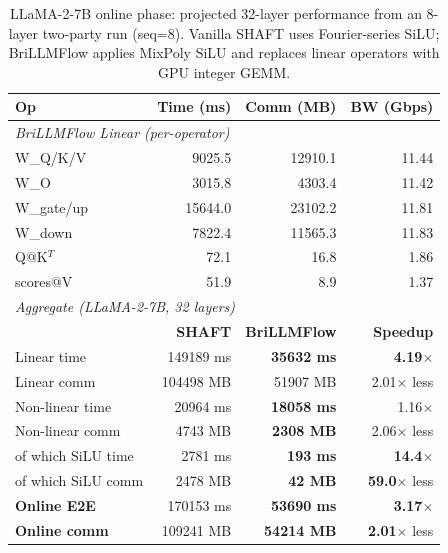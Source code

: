 \begin{table}[t]
\centering
\caption{LLaMA-2-7B online phase: projected 32-layer performance from an 8-layer two-party run (seq=8). Vanilla SHAFT uses Fourier-series SiLU; BriLLMFlow applies MixPoly SiLU and replaces linear operators with GPU integer GEMM.}
\label{tab:llama2_hybrid_comparison}
\setlength{\tabcolsep}{4pt}
\footnotesize
\begin{tabular}{lrrr}
\toprule
\textbf{Op} & \textbf{Time (ms)} & \textbf{Comm (MB)} & \textbf{BW (Gbps)} \\
\midrule
\multicolumn{4}{l}{\textit{BriLLMFlow Linear (per-operator)}} \\
W\_Q/K/V      & 9025.5 & 12910.1 & 11.44 \\
W\_O          & 3015.8 & 4303.4 & 11.42 \\
W\_gate/up    & 15644.0 & 23102.2 & 11.81 \\
W\_down       & 7822.4 & 11565.3 & 11.83 \\
Q@K$^T$       & 72.1 & 16.8 & 1.86 \\
scores@V      & 51.9 & 8.9 & 1.37 \\
\midrule
\multicolumn{4}{l}{\textit{Aggregate (LLaMA-2-7B, 32 layers)}} \\
                       & \textbf{SHAFT} & \textbf{BriLLMFlow} & \textbf{Speedup} \\
Linear time            & 149189 ms & \textbf{35632 ms} & \textbf{4.19}$\times$ \\
Linear comm            & 104498 MB & 51907 MB & 2.01$\times$ less \\
Non-linear time        & 20964 ms & \textbf{18058 ms} & 1.16$\times$ \\
Non-linear comm        & 4743 MB & \textbf{2308 MB} & 2.06$\times$ less \\
\quad of which SiLU time & 2781 ms & \textbf{193 ms} & \textbf{14.4}$\times$ \\
\quad of which SiLU comm & 2478 MB & \textbf{42 MB} & \textbf{59.0}$\times$ less \\
\midrule
\textbf{Online E2E}    & 170153 ms & \textbf{53690 ms} & \textbf{3.17}$\times$ \\
\textbf{Online comm}   & 109241 MB & \textbf{54214 MB} & \textbf{2.01}$\times$ less \\
\bottomrule
\end{tabular}
\end{table}
